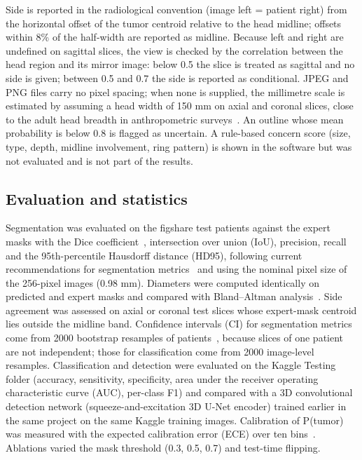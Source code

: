 \documentclass[pdflatex,sn-vancouver-num]{sn-jnl}
\begin{document}
Side is reported in the radiological convention (image left = patient right) from the horizontal offset of the tumor centroid relative to the head midline; offsets within 8\% of the half-width are reported as midline. Because left and right are undefined on sagittal slices, the view is checked by the correlation between the head region and its mirror image: below 0.5 the slice is treated as sagittal and no side is given; between 0.5 and 0.7 the side is reported as conditional. JPEG and PNG files carry no pixel spacing; when none is supplied, the millimetre scale is estimated by assuming a head width of 150 mm on axial and coronal slices, close to the adult head breadth in anthropometric surveys~\cite{gordon2014ansur}. An outline whose mean probability is below 0.8 is flagged as uncertain. A rule-based concern score (size, type, depth, midline involvement, ring pattern) is shown in the software but was not evaluated and is not part of the results.

\subsection{Evaluation and statistics}

Segmentation was evaluated on the figshare test patients against the expert masks with the Dice coefficient~\cite{dice1945}, intersection over union (IoU), precision, recall and the 95th-percentile Hausdorff distance (HD95), following current recommendations for segmentation metrics~\cite{maierhein2024metrics} and using the nominal pixel size of the 256-pixel images (0.98 mm). Diameters were computed identically on predicted and expert masks and compared with Bland--Altman analysis~\cite{bland1986}. Side agreement was assessed on axial or coronal test slices whose expert-mask centroid lies outside the midline band. Confidence intervals (CI) for segmentation metrics come from 2000 bootstrap resamples of patients~\cite{efron1993bootstrap}, because slices of one patient are not independent; those for classification come from 2000 image-level resamples. Classification and detection were evaluated on the Kaggle Testing folder (accuracy, sensitivity, specificity, area under the receiver operating characteristic curve (AUC), per-class F1) and compared with a 3D convolutional detection network (squeeze-and-excitation 3D U-Net encoder) trained earlier in the same project on the same Kaggle training images. Calibration of P(tumor) was measured with the expected calibration error (ECE) over ten bins~\cite{guo2017calibration}. Ablations varied the mask threshold (0.3, 0.5, 0.7) and test-time flipping.
\end{document}
